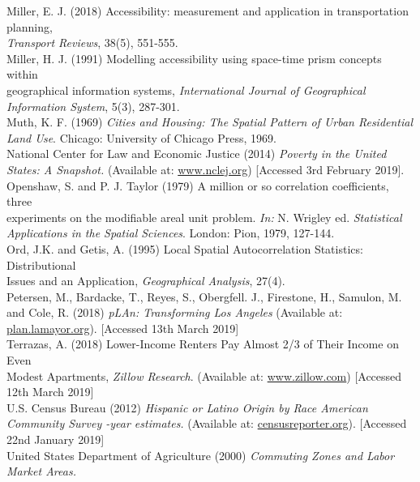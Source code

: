 \documentclass[a4paper,UKenglish]{lipics-v2018}
\begin{document}
Miller, E. J. (2018) Accessibility: measurement and application in transportation planning,\\
\indent \textit{Transport Reviews}, 38(5), 551-555. \\
Miller, H. J. (1991) Modelling accessibility using space-time prism concepts within \\
\indent geographical information systems, \textit{International Journal of Geographical Information 
\indent System}, 5(3), 287-301. \\
Muth, K. F. (1969) \textit{Cities and Housing: The Spatial Pattern of Urban Residential Land 
\indent Use}. Chicago: University of Chicago Press, 1969. \\
National Center for Law and Economic Justice (2014) \textit{Poverty in the United States: A 
\indent Snapshot.} (Available at: \href{http://www.nclej.org/poverty-in-the-us.php}{www.nclej.org}) [Accessed 3rd February 2019]. \\
Openshaw, S. and P. J. Taylor (1979) A million or so correlation coefficients, three \\
\indent experiments on the modifiable areal unit problem. \textit{In:} N. Wrigley ed. \textit{Statistical \\
\indent Applications in the Spatial Sciences}. London: Pion, 1979, 127-144.\\
Ord, J.K. and Getis, A. (1995) Local Spatial Autocorrelation Statistics: Distributional \\
\indent Issues and an Application, \textit{Geographical Analysis}, 27(4). \\
Petersen, M., Bardacke, T., Reyes, S., Obergfell. J., Firestone, H., Samulon, M. and Cole,
\indent R. (2018) \textit{pLAn: Transforming Los Angeles} (Available at: \href{http://plan.lamayor.org/}{plan.lamayor.org}). [Accessed 
\indent 13th March 2019] \\
Terrazas, A. (2018) Lower-Income Renters Pay Almost 2/3 of Their Income on Even \\
\indent Modest Apartments, \textit{Zillow Research}. (Available at: \href{https://www.zillow.com/research/q2-2018-affordability-21286/}{www.zillow.com}) [Accessed 12th 
\indent March 2019] \\
U.S. Census Bureau (2012) \textit{Hispanic or Latino Origin by Race American Community Survey -year estimates.} (Available at: \href{https://censusreporter.org/}{censusreporter.org}). [Accessed 22nd January 2019] \\
United States Department of Agriculture (2000) \textit{Commuting Zones and Labor Market Areas.} \\
\end{document}
